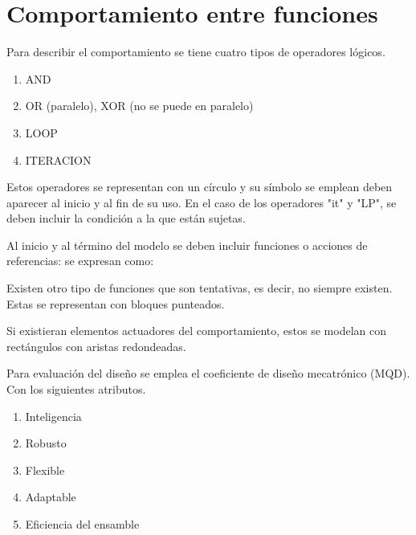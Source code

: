 \section{Comportamiento entre funciones}
Para describir el comportamiento se tiene cuatro tipos de operadores lógicos.

\begin{enumerate}
    \item AND
    \item OR (paralelo), XOR (no se puede en paralelo)
    \item LOOP
    \item ITERACION
\end{enumerate}

Estos operadores se representan con un círculo y su símbolo se emplean deben aparecer al inicio y al fin de su uso. En el caso de los operadores "it" y "LP", se deben incluir la condición a la que están sujetas. 

Al inicio y al término del modelo se deben incluir funciones o acciones de referencias: se expresan como:

Existen otro tipo de funciones que son tentativas, es decir, no siempre existen. Estas se representan con bloques punteados. 

Si existieran elementos actuadores del comportamiento, estos se modelan con rectángulos con aristas redondeadas.

Para evaluación del diseño se emplea el coeficiente de diseño mecatrónico (MQD). Con los siguientes atributos.
\begin{enumerate}
    \item Inteligencia
    \item Robusto
    \item Flexible
    \item Adaptable
    \item Eficiencia del ensamble
\end{enumerate}